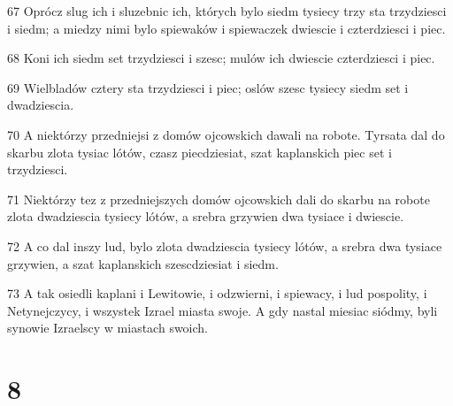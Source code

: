 \par 67 Oprócz slug ich i sluzebnic ich, których bylo siedm tysiecy trzy sta trzydziesci i siedm; a miedzy nimi bylo spiewaków i spiewaczek dwiescie i czterdziesci i piec.
\par 68 Koni ich siedm set trzydziesci i szesc; mulów ich dwiescie czterdziesci i piec.
\par 69 Wielbladów cztery sta trzydziesci i piec; oslów szesc tysiecy siedm set i dwadziescia.
\par 70 A niektórzy przedniejsi z domów ojcowskich dawali na robote. Tyrsata dal do skarbu zlota tysiac lótów, czasz piecdziesiat, szat kaplanskich piec set i trzydziesci.
\par 71 Niektórzy tez z przedniejszych domów ojcowskich dali do skarbu na robote zlota dwadziescia tysiecy lótów, a srebra grzywien dwa tysiace i dwiescie.
\par 72 A co dal inszy lud, bylo zlota dwadziescia tysiecy lótów, a srebra dwa tysiace grzywien, a szat kaplanskich szescdziesiat i siedm.
\par 73 A tak osiedli kaplani i Lewitowie, i odzwierni, i spiewacy, i lud pospolity, i Netynejczycy, i wszystek Izrael miasta swoje. A gdy nastal miesiac siódmy, byli synowie Izraelscy w miastach swoich.

\chapter{8}

